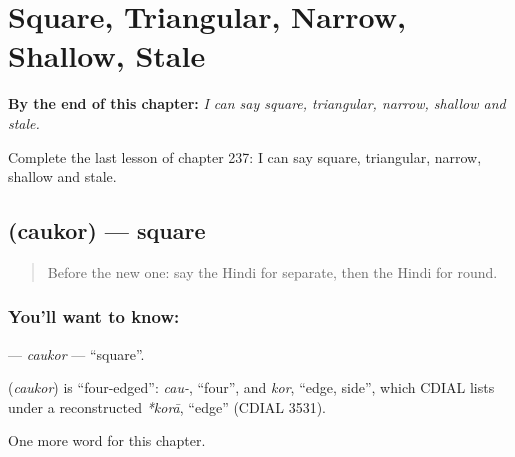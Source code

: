 
\chapter{Square, Triangular, Narrow, Shallow, Stale}
\label{ch:hi-square-triangular-narrow-shallow-stale}

\begin{chapteropening}
\textbf{By the end of this chapter:} \emph{I can say square, triangular, narrow, shallow and stale.}

Complete the last lesson of chapter 237: I can say square, triangular, narrow, shallow and stale.
\end{chapteropening}

\section[\texorpdfstring{\hi{चौकोर} (caukor)}{चौकोर (caukor)}]{ (caukor) — square}

\label{lesson:HI-C237-caukor}



\begin{quote}
Before the new one: say the Hindi for separate, then the Hindi for round.
\end{quote}

\subsection*{You'll want to know: }
\textbf{} — \emph{caukor} — \textquotedblleft{}square\textquotedblright{}.

\begin{cousinweb}
\textbf{} (\emph{caukor}) is \textquotedblleft{}four-edged\textquotedblright{}: \emph{cau-}, \textquotedblleft{}four\textquotedblright{}, and \emph{kor}, \textquotedblleft{}edge, side\textquotedblright{}, which CDIAL lists under a reconstructed \emph{*korā}, \textquotedblleft{}edge\textquotedblright{} (CDIAL 3531).
\end{cousinweb}

\begin{grammarlens}[title={What you've built}]
One more word for this chapter.
\end{grammarlens}

